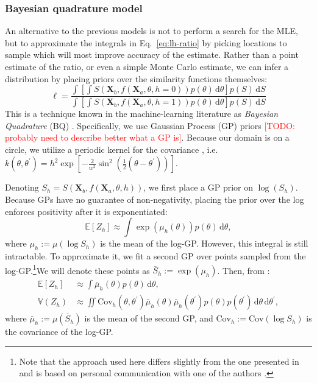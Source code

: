 \documentclass[10pt,letterpaper]{article}
\newcommand{\TODO}[1]{\textcolor{red}{[TODO: #1]}}
\newcommand{\Xa}[0]{\mathbf{X}_a}
\newcommand{\Xb}[0]{\mathbf{X}_b}
\newcommand{\hi}[0]{h=0}
\newcommand{\hf}[0]{h=1}
\newcommand{\dif}[0]{\,\mathrm{d}}
\begin{document}
\subsubsection{Bayesian quadrature model}

An alternative to the previous models is not to perform a search for
the MLE, but to approximate the integrals in Eq.~\ref{eq:lh-ratio} by
picking locations to sample which will most improve accuracy of the
estimate. Rather than a point estimate of the ratio, or even a simple
Monte Carlo estimate, we can infer a distribution by placing priors
over the similarity functions themselves:
\begin{equation}
\ell = \frac{\int \left[\int S(\Xb, f(\Xa, \theta, \hi))p(\theta)\dif\theta\right] p(S)\dif S}{\int \left[\int S(\Xb, f(\Xa, \theta, \hf))p(\theta)\dif\theta\right] p(S)\dif S}
\end{equation}
This is a technique known in the machine-learning literature as
\textit{Bayesian Quadrature} (BQ)
\cite{Diaconis:1988uo,OHagan:1991tx,Osborne:2012tm}. Specifically, we
use Gaussian Process (GP) priors \cite{Osborne:2012tm} \TODO{probably
  need to describe better what a GP is}. Because our domain is on a
circle, we utilize a periodic kernel for the covariance
\cite{Rasmussen:2006vz}, i.e. $k(\theta,
\theta^\prime)=h^2\exp[-\frac{2}{w^2}\sin^2(\frac{1}{2}(\theta-\theta^\prime))]$.

Denoting $S_h=S(\Xb, f(\Xa, \theta, h))$, we first place a GP prior on
$\log(S_h)$. Because GPs have no guarantee of non-negativity, placing
the prior over the log enforces positivity after it is exponentiated:
\begin{equation}
\mathbb{E}[Z_h] \approx \int \exp(\mu_h(\theta))p(\theta)\dif\theta,
\end{equation}
where $\mu_h:=\mu(\log S_h)$ is the mean of the log-GP. However, this
integral is still intractable. To approximate it, we fit a second GP
over points sampled from the log-GP.\footnote{Note that the approach
  used here differs slightly from the one presented in
   and is based on personal communication with
  one of the authors \cite{Duvenaud:2013td}.}We will denote these
points as $\bar{S}_h:=\exp(\mu_h)$. Then, from
:
\begin{align}
  \mathbb{E}[Z_h] &\approx \int \bar{\mu}_h(\theta)p(\theta)\dif\theta,\\
  \mathbb{V}(Z_h) &\approx \iint \mathrm{Cov}_h(\theta,
  \theta^\prime)\bar{\mu}_h(\theta)\bar{\mu}_h(\theta^\prime)p(\theta)p(\theta^\prime)\dif\theta\dif\theta^\prime,
\end{align}
where $\bar{\mu}_h:=\mu(\bar{S}_h)$ is the mean of the second GP, and
$\mathrm{Cov}_h:=\mathrm{Cov}(\log S_h)$ is the covariance of the
log-GP.
\end{document}
